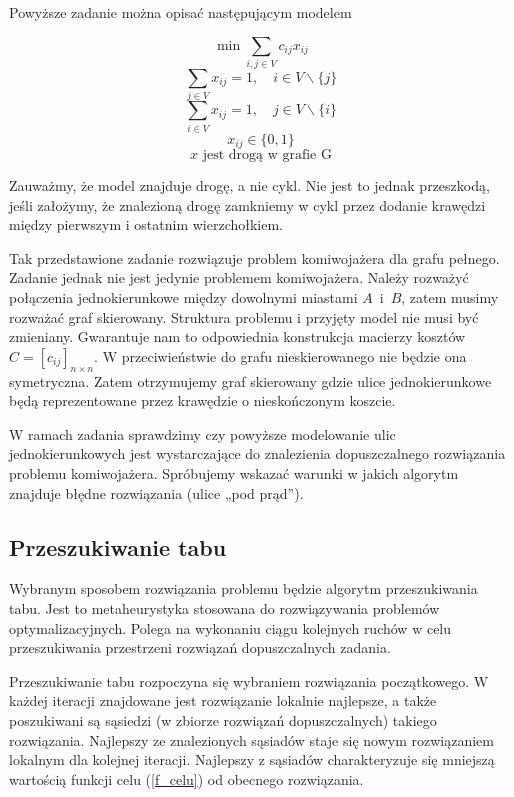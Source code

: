 \documentclass[11pt,a4paper,twoside]{article}
\begin{document}
Powyższe zadanie można opisać następującym modelem

\begin{equation}
\min \sum_{i,j \in V} c_{ij} x_{ij} 
\label{f_celu}
\end{equation}
\begin{equation}
\sum_{j \in V} x_{ij}=1, \quad i \in V \backslash \{j\} 
\end{equation}
\begin{equation}
\sum_{i \in V} x_{ij}=1, \quad j \in V \backslash \{i\} 
\end{equation}
\begin{equation}
x_{ij} \in \{0,1\}
\end{equation}
\begin{equation}
x \text{ jest drogą w grafie G}
\end{equation}

Zauważmy, że model znajduje drogę, a nie cykl. Nie jest to jednak przeszkodą, jeśli założymy, że znalezioną drogę zamkniemy w cykl przez dodanie krawędzi między pierwszym i ostatnim wierzchołkiem.

Tak przedstawione zadanie rozwiązuje problem komiwojażera dla grafu pełnego. Zadanie jednak nie jest jedynie problemem komiwojażera. Należy rozważyć połączenia jednokierunkowe między dowolnymi miastami \mbox{$A$ i $B$}, zatem musimy rozważać graf skierowany. Struktura problemu i przyjęty model nie musi być zmieniany. Gwarantuje nam to odpowiednia konstrukcja macierzy kosztów $C = [c_{ij}]_{n\times n}$. W przeciwieństwie do grafu nieskierowanego nie będzie ona symetryczna. Zatem otrzymujemy graf skierowany gdzie ulice jednokierunkowe będą reprezentowane przez krawędzie o nieskończonym koszcie. 

W ramach zadania sprawdzimy czy powyższe modelowanie ulic jednokierunkowych jest wystarczające do znalezienia dopuszczalnego rozwiązania problemu komiwojażera. Spróbujemy wskazać warunki w jakich algorytm znajduje błędne rozwiązania (ulice „pod prąd”).

\subsection{Przeszukiwanie tabu}
Wybranym sposobem rozwiązania problemu będzie algorytm przeszukiwania tabu. Jest to metaheurystyka stosowana do rozwiązywania problemów optymalizacyjnych. Polega na  wykonaniu ciągu kolejnych ruchów w celu przeszukiwania przestrzeni rozwiązań dopuszczalnych zadania. 

Przeszukiwanie tabu rozpoczyna się wybraniem rozwiązania początkowego. W każdej iteracji znajdowane jest rozwiązanie lokalnie najlepsze, a także poszukiwani są sąsiedzi (w zbiorze rozwiązań dopuszczalnych) takiego rozwiązania. Najlepszy ze znalezionych sąsiadów staje się nowym rozwiązaniem lokalnym dla kolejnej iteracji. Najlepszy z sąsiadów charakteryzuje się mniejszą wartością funkcji celu (\ref{f_celu}) od obecnego rozwiązania.
\end{document}
